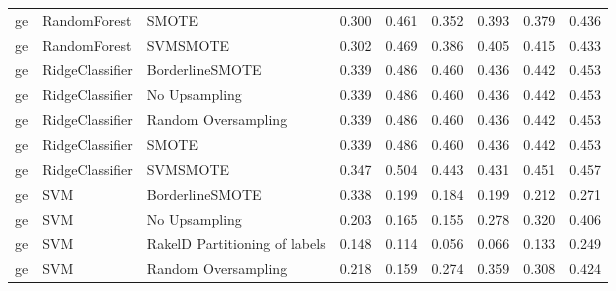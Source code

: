 \begin{tabular}{lllllllll}
      ge &                    RandomForest &                         SMOTE & 0.300 &                     0.461 &                 0.352 &                  0.393 &                                   0.379 &     0.436 \\
      ge &                    RandomForest &                      SVMSMOTE & 0.302 &                     0.469 &                 0.386 &                  0.405 &                                   0.415 &     0.433 \\
      ge &                 RidgeClassifier &               BorderlineSMOTE & 0.339 &                     0.486 &                 0.460 &                  0.436 &                                   0.442 &     0.453 \\
      ge &                 RidgeClassifier &                 No Upsampling & 0.339 &                     0.486 &                 0.460 &                  0.436 &                                   0.442 &     0.453 \\
      ge &                 RidgeClassifier &           Random Oversampling & 0.339 &                     0.486 &                 0.460 &                  0.436 &                                   0.442 &     0.453 \\
      ge &                 RidgeClassifier &                         SMOTE & 0.339 &                     0.486 &                 0.460 &                  0.436 &                                   0.442 &     0.453 \\
      ge &                 RidgeClassifier &                      SVMSMOTE & 0.347 &                     0.504 &                 0.443 &                  0.431 &                                   0.451 &     0.457 \\
      ge &                             SVM &               BorderlineSMOTE & 0.338 &                     0.199 &                 0.184 &                  0.199 &                                   0.212 &     0.271 \\
      ge &                             SVM &                 No Upsampling & 0.203 &                     0.165 &                 0.155 &                  0.278 &                                   0.320 &     0.406 \\
      ge &                             SVM & RakelD Partitioning of labels & 0.148 &                     0.114 &                 0.056 &                  0.066 &                                   0.133 &     0.249 \\
      ge &                             SVM &           Random Oversampling & 0.218 &                     0.159 &                 0.274 &                  0.359 &                                   0.308 &     0.424 \\

\end{tabular}
